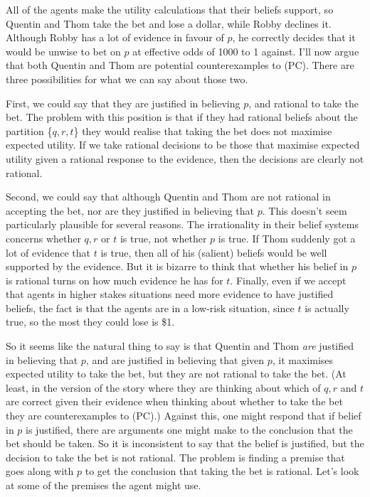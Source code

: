 \noindent All of the agents make the utility calculations that their beliefs support, so Quentin and Thom take the bet and lose a dollar, while Robby declines it. Although Robby has a lot of evidence in favour of \(p\), he correctly decides that it would be unwise to bet on \(p\) at effective odds of 1000 to 1 against. I'll now argue that both Quentin and Thom are potential counterexamples to (PC). There are three possibilities for what we can say about those two.

First, we could say that they are justified in believing \(p\), and rational to take the bet. The problem with this position is that if they had rational beliefs about the partition \{\(q, r, t\)\} they would realise that taking the bet does not maximise expected utility. If we take rational decisions to be those that maximise expected utility given a rational response to the evidence, then the decisions are clearly not rational.

Second, we could say that although Quentin and Thom are not rational in accepting the bet, nor are they justified in believing that \(p\). This doesn't seem particularly plausible for several reasons. The irrationality in their belief systems concerns whether \(q, r\) or \(t\) is true, not whether \(p\) is true. If Thom suddenly got a lot of evidence that \(t\) is true, then all of his (salient) beliefs would be well supported by the evidence. But it is bizarre to think that whether his belief in \(p\) is rational turns on how much evidence he has for \(t\). Finally, even if we accept that agents in higher stakes situations need more evidence to have justified beliefs, the fact is that the agents are in a low-risk situation, since \(t\) is actually true, so the most they could lose is \$1.

So it seems like the natural thing to say is that Quentin and Thom \textit{are} justified in believing that \(p\), and are justified in believing that given \(p\), it maximises expected utility to take the bet, but they are not rational to take the bet. (At least, in the version of the story where they are thinking about which of \(q, r\) and \(t\) are correct given their evidence when thinking about whether to take the bet they are counterexamples to (PC).) Against this, one might respond that if belief in \(p\) is justified, there are arguments one might make to the conclusion that the bet should be taken. So it is inconsistent to say that the belief is justified, but the decision to take the bet is not rational. The problem is finding a premise that goes along with \(p\) to get the conclusion that taking the bet is rational. Let's look at some of the premises the agent might use.

